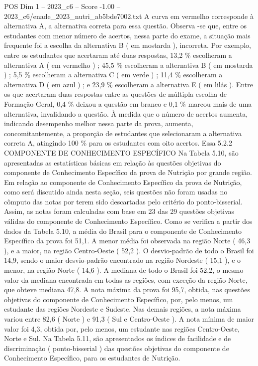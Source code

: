 \begin{textsample}{POS Dim 1 – 2023\_c6 – Score -1.00 – 2023\_c6/enade\_2023\_nutri\_ab5bde7002.txt}
A curva em vermelho corresponde à alternativa A, a alternativa correta para essa questão.
Observa -se que, entre os estudantes com menor número de acertos, nessa parte do exame, a situação mais frequente foi a escolha da alternativa B ( em mostarda ), incorreta.
Por exemplo, entre os estudantes que acertaram até duas respostas, 13,2 \% escolheram a alternativa A ( em vermelho ) ; 45,5 \% escolheram a alternativa B ( em mostarda ) ; 5,5 \% escolheram a alternativa C ( em verde ) ; 11,4 \% escolheram a alternativa D ( em azul ) ; e 23,9 \% escolheram a alternativa E ( em lilás ).
Entre os que acertaram duas respostas entre as questões de múltipla escolha de Formação Geral, 0,4 \% deixou a questão em branco e 0,1 \% marcou mais de uma alternativa, invalidando a questão.
À medida que o número de acertos aumenta, indicando desempenho melhor nessa parte da prova, aumenta, concomitantemente, a proporção de estudantes que selecionaram a alternativa correta A, atingindo 100 \% para os estudantes com oito acertos.
Essa 5.2.2 COMPONENTE DE CONHECIMENTO ESPECÍFICO Na Tabela 5.10, são apresentadas as estatísticas básicas em relação às questões objetivas do componente de Conhecimento Específico da prova de Nutrição por grande região.
Em relação ao componente de Conhecimento Específico da prova de Nutrição, como será discutido ainda nesta seção, seis questões não foram usadas no cômputo das notas por terem sido descartadas pelo critério do ponto-bisserial.
Assim, as notas foram calculadas com base em 23 das 29 questões objetivas válidas do componente de Conhecimento Específico.
Como se verifica a partir dos dados da Tabela 5.10, a média do Brasil para o componente de Conhecimento Específico da prova foi 51,1.
A menor média foi observada na região Norte ( 46,3 ), e a maior, na região Centro-Oeste ( 52,2 ).
O desvio-padrão de todo o Brasil foi 14,9, sendo o maior desvio-padrão encontrado na região Nordeste ( 15,1 ), e o menor, na região Norte ( 14,6 ).
A mediana de todo o Brasil foi 52,2, o mesmo valor da mediana encontrada em todas as regiões, com exceção da região Norte, que obteve mediana 47,8.
A nota máxima da prova foi 95,7, obtida, nas questões objetivas do componente de Conhecimento Específico, por, pelo menos, um estudante das regiões Nordeste e Sudeste.
Nas demais regiões, a nota máxima variou entre 82,6 ( Norte ) e 91,3 ( Sul e Centro-Oeste ).
A nota mínima de maior valor foi 4,3, obtida por, pelo menos, um estudante nas regiões Centro-Oeste, Norte e Sul.
Na Tabela 5.11, são apresentados os índices de facilidade e de discriminação ( ponto-bisserial ) das questões objetivas do componente de Conhecimento Específico, para os estudantes de Nutrição.

\end{textsample}
